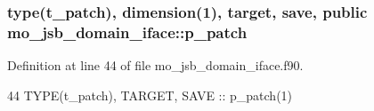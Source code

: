 \subsubsection[{p\+\_\+patch}]{\setlength{\rightskip}{0pt plus 5cm}type(t\+\_\+patch), dimension(1), target, save, public mo\+\_\+jsb\+\_\+domain\+\_\+iface\+::p\+\_\+patch}\label{namespacemo__jsb__domain__iface_a0afd1d2a27a8d25a8e915997494b19ed}


Definition at line 44 of file mo\+\_\+jsb\+\_\+domain\+\_\+iface.\+f90.


\begin{DoxyCode}
44   \textcolor{keywordtype}{TYPE}(t\_patch), \textcolor{keywordtype}{TARGET}, \textcolor{keywordtype}{SAVE} :: p\_patch(1)
\end{DoxyCode}
